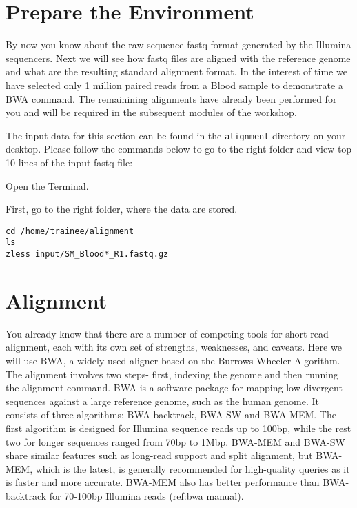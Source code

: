 \section{Prepare the Environment}

\begin{information}
By now you know about the raw sequence fastq format generated by the Illumina sequencers. Next we will see how fastq files are aligned with the reference genome and what are the resulting standard alignment format. 
In the interest of time we have selected only 1 million paired reads from a Blood sample to demonstrate a BWA command. The remainining alignments have already been performed for you and will be required in the subsequent modules of the workshop.

The input data for this section can be found in the \texttt{alignment}
directory on your desktop. Please follow the commands below to go to the right folder and view top 10 lines of the input fastq file:
\end{information}

\begin{steps}
Open the Terminal.

First, go to the right folder, where the data are stored.
\begin{lstlisting}
cd /home/trainee/alignment
ls
zless input/SM_Blood*_R1.fastq.gz
\end{lstlisting}

\end{steps}

\section{Alignment}

\begin{information}
You already know that there are a number of competing tools for short read alignment, each with its own set of strengths, weaknesses, and caveats. Here we will use BWA, a widely used aligner based on the Burrows-Wheeler Algorithm.  The alignment involves two steps- first, indexing the genome and then running the alignment command.  
BWA is a software package for mapping low-divergent sequences against a large reference genome, such as the human genome. It consists of three algorithms: BWA-backtrack, BWA-SW and BWA-MEM. The first algorithm is designed for Illumina sequence reads up to 100bp, while the rest two for longer sequences ranged from 70bp to 1Mbp. BWA-MEM and BWA-SW share similar features such as long-read support and split alignment, but BWA-MEM, which is the latest, is generally recommended for high-quality queries as it is faster and more accurate. BWA-MEM also has better performance than BWA-backtrack for 70-100bp Illumina reads (ref:bwa manual).
\end{information}

